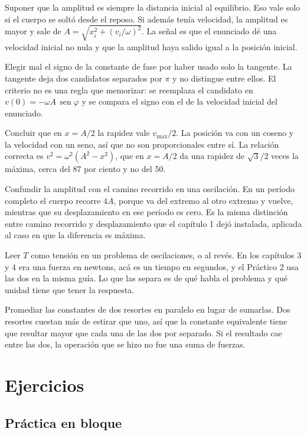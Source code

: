 \documentclass[11pt,openany]{book}
\newcommand{\sen}{\operatorname{sen}}
\begin{document}
\begin{erroresComunes}
  \item Suponer que la amplitud es siempre la distancia inicial al equilibrio. Eso vale solo si el cuerpo se soltó desde el reposo. Si además tenía velocidad, la amplitud es mayor y sale de $A = \sqrt{x_i^2 + (v_i/\omega)^2}$. La señal es que el enunciado dé una velocidad inicial no nula y que la amplitud haya salido igual a la posición inicial.
  \item Elegir mal el signo de la constante de fase por haber usado solo la tangente. La tangente deja dos candidatos separados por $\pi$ y no distingue entre ellos. El criterio no es una regla que memorizar: se reemplaza el candidato en $v(0) = -\omega A\,\sen\varphi$ y se compara el signo con el de la velocidad inicial del enunciado.
  \item Concluir que en $x = A/2$ la rapidez vale $v_{\max}/2$. La posición va con un coseno y la velocidad con un seno, así que no son proporcionales entre sí. La relación correcta es $v^2 = \omega^2(A^2-x^2)$, que en $x = A/2$ da una rapidez de $\sqrt{3}/2$ veces la máxima, cerca del 87 por ciento y no del 50.
  \item Confundir la amplitud con el camino recorrido en una oscilación. En un período completo el cuerpo recorre $4A$, porque va del extremo al otro extremo y vuelve, mientras que su desplazamiento en ese período es cero. Es la misma distinción entre camino recorrido y desplazamiento que el capítulo 1 dejó instalada, aplicada al caso en que la diferencia es máxima.
  \item Leer $T$ como tensión en un problema de oscilaciones, o al revés. En los capítulos 3 y 4 era una fuerza en newtons, acá es un tiempo en segundos, y el Práctico 2 usa las dos en la misma guía. Lo que las separa es de qué habla el problema y qué unidad tiene que tener la respuesta.
  \item Promediar las constantes de dos resortes en paralelo en lugar de sumarlas. Dos resortes cuestan más de estirar que uno, así que la constante equivalente tiene que resultar mayor que cada una de las dos por separado. Si el resultado cae entre las dos, la operación que se hizo no fue una suma de fuerzas.
\end{erroresComunes}

\section{Ejercicios}

\subsection{Práctica en bloque}
\end{document}
